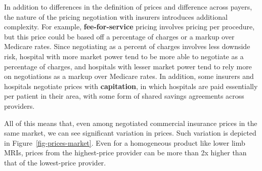 \documentclass[
  letterpaper,
  DIV=11,
  numbers=noendperiod]{scrreport}
\theoremstyle{definition}
\theoremstyle{remark}
\begin{document}
In addition to differences in the definition of prices and difference
across payers, the nature of the pricing negotiation with insurers
introduces additional complexity. For example, \textbf{fee-for-service}
pricing involves pricing per procedure, but this price could be based
off a percentage of charges or a markup over Medicare rates. Since
negotiating as a percent of charges involves less downside risk,
hospital with more market power tend to be more able to negotiate as a
percentage of charges, and hospitals with lesser market power tend to
rely more on negotiations as a markup over Medicare rates. In addition,
some insurers and hospitals negotiate prices with \textbf{capitation},
in which hospitals are paid essentially per patient in their area, with
some form of shared savings agreements across providers.

All of this means that, even among negotiated commercial insurance
prices in the same market, we can see significant variation in prices.
Such variation is depicted in Figure~\ref{fig-prices-market}. Even for a
homogeneous product like lower limb MRIs, prices from the highest-price
provider can be more than 2x higher than that of the lowest-price
provider.
\end{document}
